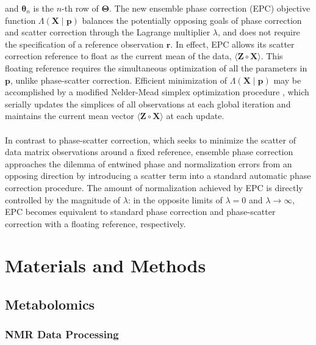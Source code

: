 \begin{doublespace}
and $\boldsymbol{\theta}_n$ is the $n$-th row of $\mathbf{\Theta}$. The new
ensemble phase correction (EPC) objective function
$\Lambda(\mathbf{X} \mid \mathbf{p})$ balances the potentially opposing goals
of phase correction and scatter correction through the Lagrange multiplier
$\lambda$, and does not require the specification of a reference observation
$\mathbf{r}$. In effect, EPC allows its scatter correction reference to float
as the current mean of the data, $\langle \mathbf{Z} \circ \mathbf{X} \rangle$.
This floating reference requires the simultaneous optimization of all the
parameters in $\mathbf{p}$, unlike phase-scatter correction. Efficient
minimization of $\Lambda(\mathbf{X} \mid \mathbf{p})$ may be accomplished by
a modified Nelder-Mead simplex optimization procedure \cite{nelder:compj1964},
which serially updates the simplices of all observations at each global
iteration and maintains the current mean vector
$\langle \mathbf{Z} \circ \mathbf{X} \rangle$ at each update.
\\\\
In contrast to phase-scatter correction, which seeks to minimize the scatter
of data matrix observations around a fixed reference, ensemble phase correction
approaches the dilemma of entwined phase and normalization errors from an
opposing direction by introducing a scatter term into a standard automatic
phase correction procedure. The amount of normalization achieved by EPC is
directly controlled by the magnitude of $\lambda$: in the opposite limits of
$\lambda = 0$ and $\lambda \to \infty$, EPC becomes equivalent to standard
phase correction and phase-scatter correction with a floating reference,
respectively.
\end{doublespace}

\section{Materials and Methods}

\subsection{Metabolomics}

\subsubsection{NMR Data Processing}

